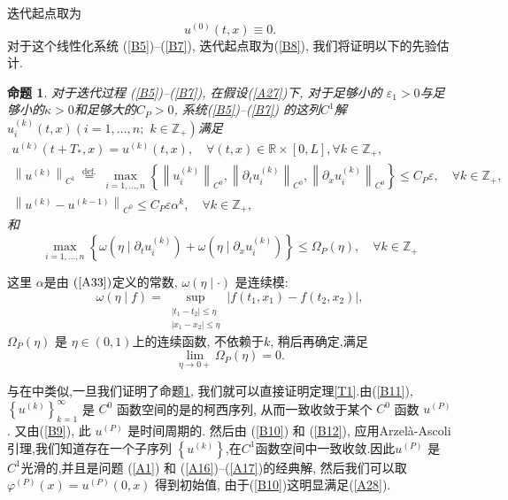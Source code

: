 \documentclass[notitlepage,cs4size,punct,oneside]{ctexrep}
\numberwithin{equation}{chapter}
\theoremstyle{mystyle}
\newtheorem{proposition}[definition]{\hspace{2em}命题}
\begin{document}
迭代起点取为
\begin{equation}\label{B8}
    u^{(0)}(t, x) \equiv 0.
\end{equation}
对于这个线性化系统 (\ref{B5})--(\ref{B7}), 迭代起点取为(\ref{B8}), 我们将证明以下的先验估计.
\begin{proposition}\label{P1}对于迭代过程 (\ref{B5})--(\ref{B7}), 在假设(\ref{A27})下, 对于足够小的 $\varepsilon_{1}>0$与足够小的$\kappa >0$和足够大的$C_{P}>0$, 系统(\ref{B5})--(\ref{B7}) 的这列$C^{1}$解 $u_{i}^{(k)}(t, x)\left(i=1, \ldots, n; \right.$ $\left.k \in \mathbb{Z}_{+}\right)$满足
    \begin{gather}
        u^{(k)}\left(t+T_{*}, x\right)=u^{(k)}(t, x), \quad \forall(t, x) \in \mathbb{R} \times[0, L], \forall k \in \mathbb{Z}_{+}, \label{B9}\\
        \left\|u^{(k)}\right\|_{C^{1}} \stackrel{\text { def. }}{=} \max _{i=1, \ldots, n}\left\{\left\|u_{i}^{(k)}\right\|_{C^{0}},\left\|\partial_{t} u_{i}^{(k)}\right\|_{C^{0}},\left\|\partial_{x} u_{i}^{(k)}\right\|_{C^{0}}\right\} \leq C_{P} \varepsilon, \quad \forall k \in \mathbb{Z}_{+}, \label{B10} \\
        \left\|u^{(k)}-u^{(k-1)}\right\|_{C^{0}} \leq C_{P} \varepsilon \alpha^{k}, \quad \forall k \in \mathbb{Z}_{+} ,\label{B11}
    \end{gather}
    和
    \begin{equation}\label{B12}
        \max _{i=1, \ldots, n}\left\{\omega\left(\eta \mid \partial_{t} u_{i}^{(k)}\right)+\omega\left(\eta \mid \partial_{x} u_{i}^{(k)}\right)\right\} \leq \Omega_{P}(\eta), \quad \forall k \in \mathbb{Z}_{+}
    \end{equation}
\end{proposition}
这里 $\alpha$是由 $(\ref{A33})$定义的常数, $\omega(\eta \mid \cdot)$ 是连续模:
\begin{equation}\label{B13}
    \omega(\eta \mid f)=\sup _{\substack{\left|t_{1}-t_{2}\right| \leq \eta \\\left|x_{1}-x_{2}\right| \leq \eta}}\left|f\left(t_{1}, x_{1}\right)-f\left(t_{2}, x_{2}\right)\right|,
\end{equation}
$\Omega_{P}(\eta)$ 是 $\eta \in(0,1)$上的连续函数, 不依赖于$k$, 稍后再确定,满足
\begin{equation}\label{B14}
    \lim _{\eta \rightarrow 0+} \Omega_{P}(\eta)=0.
\end{equation}

与在\cite{15}中类似,一旦我们证明了命题\ref{P1}, 我们就可以直接证明定理\ref{T1}.由(\ref{B11}),  $\left\{u^{(k)}\right\}_{k=1}^{\infty}$ 是 $C^{0}$ 函数空间的是的柯西序列, 从而一致收敛于某个 $C^{0}$ 函数 $u^{(P)}$ . 又由(\ref{B9}), 此 $u^{(P)}$ 是时间周期的. 然后由 (\ref{B10}) 和 (\ref{B12}), 应用Arzelà-Ascoli引理,我们知道存在一个子序列 $\left\{u^{(k)}\right\}$,在$C^{1}$函数空间中一致收敛.因此$u^{(P)}$ 是 $C^{1}$光滑的,并且是问题 (\ref{A1}) 和 (\ref{A16})--(\ref{A17})的经典解, 然后我们可以取$\varphi^{(P)}(x)=u^{(P)}(0, x)$ 得到初始值, 由于(\ref{B10})这明显满足(\ref{A28}).
\end{document}
